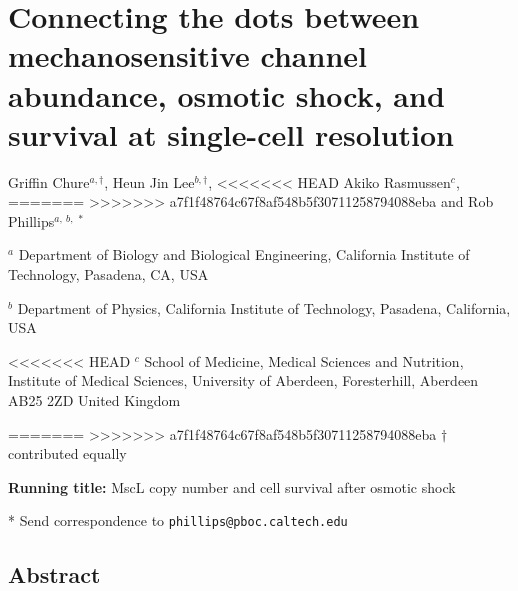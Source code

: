 \newcommand{\plusnamesingular}{}
\newcommand{\starnamesingular}{}
\newcommand{\xrefname}[1]{\protect\renewcommand{\plusnamesingular}{#1}}
\newcommand{\Xrefname}[1]{\protect\renewcommand{\starnamesingular}{#1}}
\providecommand{\cref}{\plusnamesingular~\ref}
\providecommand{\Cref}{\starnamesingular~\ref}
\providecommand{\crefformat}[2]{}
\providecommand{\Crefformat}[2]{}

\crefformat{equation}{Eq.~#2#1#3}
\Crefformat{equation}{Equation~#2#1#3}

\section{Connecting
the
dots
between
mechanosensitive
channel
abundance,
osmotic
shock,
and
survival
at
single-cell
resolution}\label{connecting-the-dots-between-mechanosensitive-channel-abundance-osmotic-shock-and-survival-at-single-cell-resolution}

Griffin
Chure\(^{a, \dagger}\),
Heun
Jin
Lee\(^{b, \dagger}\),
<<<<<<< HEAD
Akiko
Rasmussen\(^c\),
=======
>>>>>>> a7f1f48764c67f8af548b5f30711258794088eba
and
Rob
Phillips\(^{a,\ b,\ *}\)

\(^a\)
Department
of
Biology
and
Biological
Engineering,
California
Institute
of
Technology,
Pasadena,
CA,
USA

\(^b\)
Department
of
Physics,
California
Institute
of
Technology,
Pasadena,
California,
USA

<<<<<<< HEAD
\(^c\)
School
of
Medicine,
Medical
Sciences
and
Nutrition,
Institute
of
Medical
Sciences,
University
of
Aberdeen,
Foresterhill,
Aberdeen
AB25
2ZD
United
Kingdom

=======
>>>>>>> a7f1f48764c67f8af548b5f30711258794088eba
\(\dagger\)
contributed
equally

\textbf{Running
title:}
MscL
copy
number
and
cell
survival
after
osmotic
shock

* Send
correspondence
to
\texttt{phillips@pboc.caltech.edu}

\subsection{Abstract}\label{abstract}

